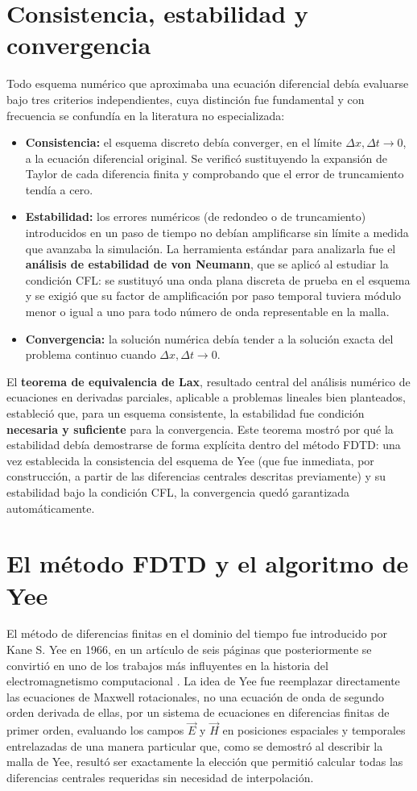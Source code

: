 \section{Consistencia, estabilidad y convergencia}
Todo esquema numérico que aproximaba una ecuación diferencial debía evaluarse bajo tres criterios independientes, cuya distinción fue fundamental y con frecuencia se confundía en la literatura no especializada:
\begin{itemize}
    \item \textbf{Consistencia:} el esquema discreto debía converger, en el límite $\Delta x, \Delta t\to 0$, a la ecuación diferencial original. Se verificó sustituyendo la expansión de Taylor de cada diferencia finita y comprobando que el error de truncamiento tendía a cero.
    \item \textbf{Estabilidad:} los errores numéricos (de redondeo o de truncamiento) introducidos en un paso de tiempo no debían amplificarse sin límite a medida que avanzaba la simulación. La herramienta estándar para analizarla fue el \textbf{análisis de estabilidad de von Neumann}, que se aplicó al estudiar la condición CFL: se sustituyó una onda plana discreta de prueba en el esquema y se exigió que su factor de amplificación por paso temporal tuviera módulo menor o igual a uno para todo número de onda representable en la malla.
    \item \textbf{Convergencia:} la solución numérica debía tender a la solución exacta del problema continuo cuando $\Delta x, \Delta t\to0$.
\end{itemize}

El \textbf{teorema de equivalencia de Lax}, resultado central del análisis numérico de ecuaciones en derivadas parciales, aplicable a problemas lineales bien planteados, estableció que, para un esquema consistente, la estabilidad fue condición \textbf{necesaria y suficiente} para la convergencia. Este teorema mostró por qué la estabilidad debía demostrarse de forma explícita dentro del método FDTD: una vez establecida la consistencia del esquema de Yee (que fue inmediata, por construcción, a partir de las diferencias centrales descritas previamente) y su estabilidad bajo la condición CFL, la convergencia quedó garantizada automáticamente.

\section{El método FDTD y el algoritmo de Yee}
El método de diferencias finitas en el dominio del tiempo fue introducido por Kane S. Yee en 1966, en un artículo de seis páginas que posteriormente se convirtió en uno de los trabajos más influyentes en la historia del electromagnetismo computacional \cite{Yee1966}. La idea de Yee fue reemplazar directamente las ecuaciones de Maxwell rotacionales, no una ecuación de onda de segundo orden derivada de ellas, por un sistema de ecuaciones en diferencias finitas de primer orden, evaluando los campos $\vec{E}$ y $\vec{H}$ en posiciones espaciales y temporales entrelazadas de una manera particular que, como se demostró al describir la malla de Yee, resultó ser exactamente la elección que permitió calcular todas las diferencias centrales requeridas sin necesidad de interpolación. 

